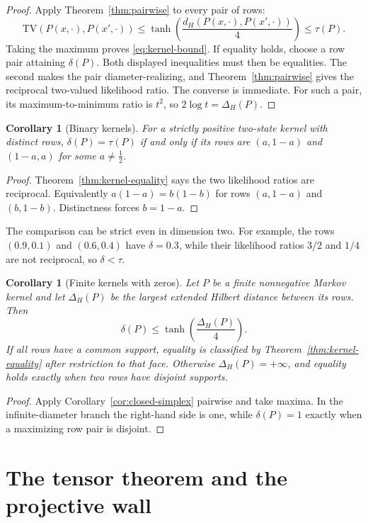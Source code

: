 \documentclass[11pt]{article}
\newtheorem{corollary}[theorem]{Corollary}
\newcommand{\TV}{\mathrm{TV}}
\newcommand{\diamH}{\Delta_{H}}
\newcommand{\1}{\mathbf{1}}
\begin{document}
\begin{proof}
Apply Theorem~\ref{thm:pairwise} to every pair of rows:
\[
 \TV(P(x,\cdot),P(x',\cdot))
 \leq \tanh\!\left(\frac{d_H(P(x,\cdot),P(x',\cdot))}{4}\right)
 \leq \tau(P).
\]
Taking the maximum proves \eqref{eq:kernel-bound}.  If equality holds, choose
a row pair attaining $\delta(P)$.  Both displayed inequalities must then be
equalities.  The second makes the pair diameter-realizing, and
Theorem~\ref{thm:pairwise} gives the reciprocal two-valued likelihood ratio.
The converse is immediate.  For such a pair, its maximum-to-minimum ratio is
$t^2$, so $2\log t=\diamH(P)$.
\end{proof}

\begin{corollary}[Binary kernels]
For a strictly positive two-state kernel with distinct rows,
$\delta(P)=\tau(P)$ if and only if its rows are $(a,1-a)$ and $(1-a,a)$ for
some $a\ne\frac12$.
\end{corollary}

\begin{proof}
Theorem~\ref{thm:kernel-equality} says the two likelihood ratios are
reciprocal.  Equivalently $a(1-a)=b(1-b)$ for rows $(a,1-a)$ and $(b,1-b)$.
Distinctness forces $b=1-a$.
\end{proof}

The comparison can be strict even in dimension two.  For example, the rows
$(0.9,0.1)$ and $(0.6,0.4)$ have $\delta=0.3$, while their likelihood ratios
$3/2$ and $1/4$ are not reciprocal, so $\delta<\tau$.

\begin{corollary}[Finite kernels with zeros]
\label{cor:kernel-zeros}
Let $P$ be a finite nonnegative Markov kernel and let $\diamH(P)$ be the
largest extended Hilbert distance between its rows.  Then
\[
 \delta(P)\leq\tanh\!\left(\frac{\diamH(P)}4\right).
\]
If all rows have a common support, equality is classified by
Theorem~\ref{thm:kernel-equality} after restriction to that face.  Otherwise
$\diamH(P)=+\infty$, and equality holds exactly when two rows have disjoint
supports.
\end{corollary}

\begin{proof}
Apply Corollary~\ref{cor:closed-simplex} pairwise and take maxima.  In the
infinite-diameter branch the right-hand side is one, while
$\delta(P)=1$ exactly when a maximizing row pair is disjoint.
\end{proof}

\section{The tensor theorem and the projective wall}
\end{document}
